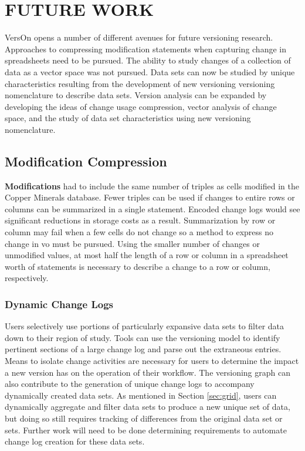 
\chapter{FUTURE WORK}\label{ch:future}

VersOn opens a number of different avenues for future versioning research.
Approaches to compressing modification statements when capturing change in spreadsheets need to be pursued.
The ability to study changes of a collection of data as a vector space was not pursued.
Data sets can now be studied by unique characteristics resulting from the development of new versioning versioning nomenclature to describe data sets.
Version analysis can be expanded by developing the ideas of change usage compression, vector analysis of change space, and the study of data set characteristics using new versioning nomenclature.

\section{Modification Compression}

\textbf{Modifications} had to include the same number of triples as cells modified in the Copper Minerals database.
Fewer triples can be used if changes to entire rows or columns can be summarized in a single statement.
Encoded change logs would see significant reductions in storage costs as a result.
Summarization by row or column may fail when a few cells do not change so a method to express no change in \gls{vo} must be pursued.
Using the smaller number of changes or unmodified values, at most half the length of a row or column in a spreadsheet worth of statements is necessary to describe a change to a row or column, respectively.

\subsection{Dynamic Change Logs}

Users selectively use portions of particularly expansive data sets to filter data down to their region of study. 
Tools can use the versioning model to identify pertinent sections of a large change log and parse out the extraneous entries.
Means to isolate change activities are necessary for users to determine the impact a new version has on the operation of their workflow.
The versioning graph can also contribute to the generation of unique change logs to accompany dynamically created data sets.
As mentioned in Section \ref{sec:grid}, users can dynamically aggregate and filter data sets to produce a new unique set of data, but doing so still requires tracking of differences from the original data set or sets.
Further work will need to be done determining requirements to automate change log creation for these data sets.

